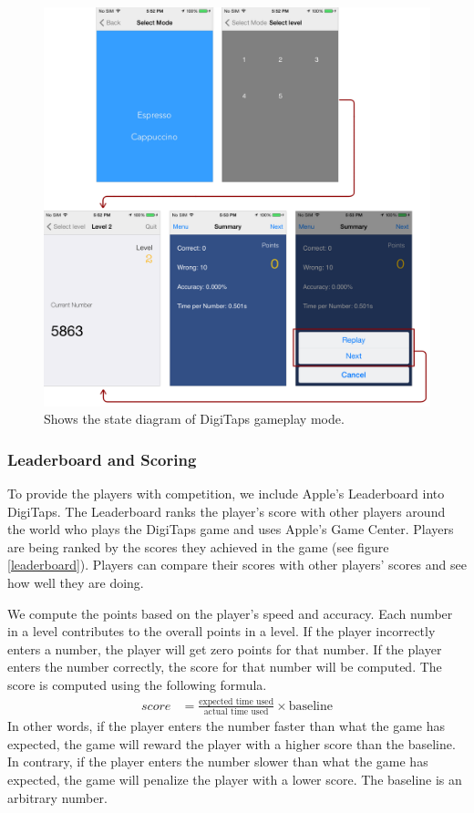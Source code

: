 \begin{figure}[ht!]
  \centering
  \includegraphics[width=1.0\textwidth]{figures/gameplay.png}
  \caption{Shows the state diagram of DigiTaps gameplay mode.}
  \label{gameplay}
\end{figure}
    
\subsubsection{Leaderboard and Scoring}
    To provide the players with competition, we include Apple's Leaderboard into DigiTaps. The Leaderboard ranks the player's score with other players around the world who plays the DigiTaps game and uses Apple's Game Center. Players are being ranked by the scores they achieved in the game (see figure \ref{leaderboard}). Players can compare their scores with other players' scores and see how well they are doing.
    \par
    We compute the points based on the player's speed and accuracy. Each number in a level contributes to the overall points in a level. If the player incorrectly enters a number, the player will get zero points for that number. If the player enters the number correctly, the score for that number will be computed. The score is computed using the following formula.
    \begin{align*}
      score &= \frac{\mbox{expected time used}}{\mbox{actual time used}} \times \mbox{baseline}
    \end{align*}
    In other words, if the player enters the number faster than what the game has expected, the game will reward the player with a higher score than the baseline. In contrary, if the player enters the number slower than what the game has expected, the game will penalize the player with a lower score. The baseline is an arbitrary number.
    
